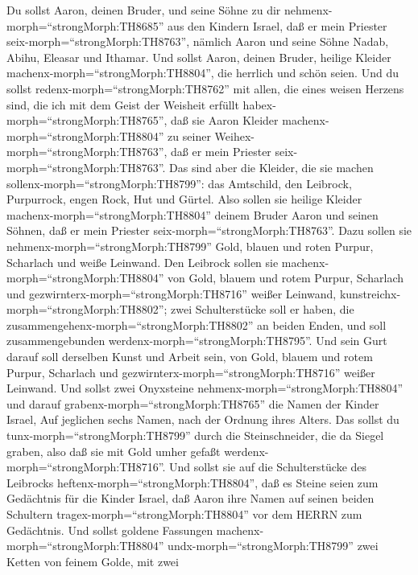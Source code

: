  Du sollst Aaron, deinen Bruder, und seine Söhne zu dir
nehmenx-morph=``strongMorph:TH8685'' aus den Kindern Israel, daß er mein
Priester seix-morph=``strongMorph:TH8763'', nämlich Aaron und seine
Söhne Nadab, Abihu, Eleasar und Ithamar.  Und sollst Aaron,
deinen Bruder, heilige Kleider machenx-morph=``strongMorph:TH8804'', die
herrlich und schön seien.  Und du sollst
redenx-morph=``strongMorph:TH8762'' mit allen, die eines weisen Herzens
sind, die ich mit dem Geist der Weisheit erfüllt
habex-morph=``strongMorph:TH8765'', daß sie Aaron Kleider
machenx-morph=``strongMorph:TH8804'' zu seiner
Weihex-morph=``strongMorph:TH8763'', daß er mein Priester
seix-morph=``strongMorph:TH8763''.  Das sind aber die
Kleider, die sie machen sollenx-morph=``strongMorph:TH8799'': das
Amtschild, den Leibrock, Purpurrock, engen Rock, Hut und Gürtel. Also
sollen sie heilige Kleider machenx-morph=``strongMorph:TH8804'' deinem
Bruder Aaron und seinen Söhnen, daß er mein Priester
seix-morph=``strongMorph:TH8763''.  Dazu sollen sie
nehmenx-morph=``strongMorph:TH8799'' Gold, blauen und roten Purpur,
Scharlach und weiße Leinwand.  Den Leibrock sollen sie
machenx-morph=``strongMorph:TH8804'' von Gold, blauem und rotem Purpur,
Scharlach und gezwirnterx-morph=``strongMorph:TH8716'' weißer Leinwand,
kunstreichx-morph=``strongMorph:TH8802'';  zwei
Schulterstücke soll er haben, die
zusammengehenx-morph=``strongMorph:TH8802'' an beiden Enden, und soll
zusammengebunden werdenx-morph=``strongMorph:TH8795''.  Und
sein Gurt darauf soll derselben Kunst und Arbeit sein, von Gold, blauem
und rotem Purpur, Scharlach und gezwirnterx-morph=``strongMorph:TH8716''
weißer Leinwand.  Und sollst zwei Onyxsteine
nehmenx-morph=``strongMorph:TH8804'' und darauf
grabenx-morph=``strongMorph:TH8765'' die Namen der Kinder Israel,
 Auf jeglichen sechs Namen, nach der Ordnung ihres Alters.
 Das sollst du tunx-morph=``strongMorph:TH8799'' durch die
Steinschneider, die da Siegel graben, also daß sie mit Gold umher gefaßt
werdenx-morph=``strongMorph:TH8716''.  Und sollst sie auf
die Schulterstücke des Leibrocks heftenx-morph=``strongMorph:TH8804'',
daß es Steine seien zum Gedächtnis für die Kinder Israel, daß Aaron ihre
Namen auf seinen beiden Schultern tragex-morph=``strongMorph:TH8804''
vor dem HERRN zum Gedächtnis.  Und sollst goldene Fassungen
machenx-morph=``strongMorph:TH8804'' 
undx-morph=``strongMorph:TH8799'' zwei Ketten von feinem Golde, mit zwei
